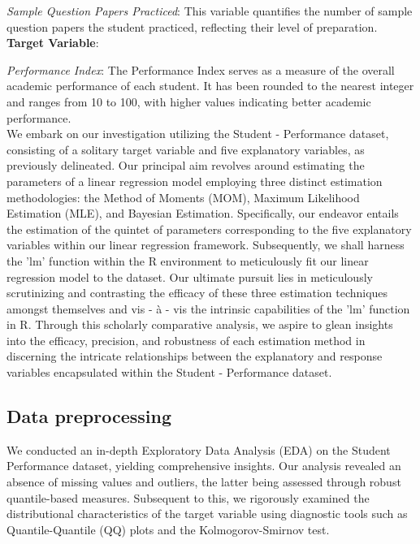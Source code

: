 \documentclass[12pt]{article}
\begin{document}
	\textit{Sample Question Papers Practiced}: This variable quantifies the number of sample question papers the student practiced, reflecting their level of preparation.
	\\
	\textbf{Target Variable}:
	
	\textit{Performance Index}: The Performance Index serves as a measure of the overall academic performance of each student. It has been rounded to the nearest integer and ranges from 10 to 100, with higher values indicating better academic performance.
	\\
	
	We embark on our investigation utilizing the Student - Performance dataset, consisting of a solitary target variable and five explanatory variables, as previously delineated. Our principal aim revolves around estimating the parameters of a linear regression model employing three distinct estimation methodologies: the Method of Moments (MOM), Maximum Likelihood Estimation (MLE), and Bayesian Estimation. Specifically, our endeavor entails the estimation of the quintet of parameters corresponding to the five explanatory variables within our linear regression framework. Subsequently, we shall harness the 'lm' function within the R environment to meticulously fit our linear regression model to the dataset. Our ultimate pursuit lies in meticulously scrutinizing and contrasting the efficacy of these three estimation techniques amongst themselves and vis - à - vis the intrinsic capabilities of the 'lm' function in R. Through this scholarly comparative analysis, we aspire to glean insights into the efficacy, precision, and robustness of each estimation method in discerning the intricate relationships between the explanatory and response variables encapsulated within the Student - Performance dataset.
	
	
	
	\subsection{Data preprocessing}
	
	We conducted an in-depth Exploratory Data Analysis (EDA) on the Student Performance dataset, yielding comprehensive insights. Our analysis revealed an absence of missing values and outliers, the latter being assessed through robust quantile-based measures. Subsequent to this, we rigorously examined the distributional characteristics of the target variable using diagnostic tools such as Quantile-Quantile (QQ) plots and the Kolmogorov-Smirnov test.
	
\end{document}
